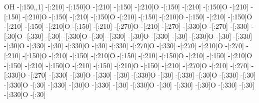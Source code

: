               OH%
    -[:150,,1]%
       -[:210]%
       -[:150]O%
       -[:210]%
       -[:150]%
       -[:210]O%
       -[:150]%
       -[:210]%
       -[:150]O%
       -[:210]%
       -[:150]%
       -[:210]O%
       -[:150]%
       -[:210]%
       -[:150]O%
       -[:210]%
       -[:150]%
       -[:210]O%
       -[:150]%
       -[:210]%
       -[:150]O%
       -[:210]%
       -[:150]%
       -[:210]O%
       -[:150]%
       -[:210]%
       -[:270]O%
       -[:210]%
       -[:270]%
       -[:330]O%
       -[:270]%
       -[:330]%
        -[:30]O%
       -[:330]%
        -[:30]%
       -[:330]O%
        -[:30]%
       -[:330]%
        -[:30]O%
       -[:330]%
        -[:30]%
       -[:330]O%
        -[:30]%
       -[:330]%
        -[:30]O%
       -[:330]%
        -[:30]%
       -[:330]O%
        -[:30]%
       -[:330]%
       -[:270]O%
       -[:330]%
       -[:270]%
       -[:210]O%
       -[:270]%
       -[:210]%
       -[:150]O%
       -[:210]%
       -[:150]%
       -[:210]O%
       -[:150]%
       -[:210]%
       -[:150]O%
       -[:210]%
       -[:150]%
       -[:210]O%
       -[:150]%
       -[:210]%
       -[:150]O%
       -[:210]%
       -[:150]%
       -[:210]O%
       -[:150]%
       -[:210]%
       -[:270]O%
       -[:210]%
       -[:270]%
       -[:330]O%
       -[:270]%
       -[:330]%
        -[:30]O%
       -[:330]%
        -[:30]%
       -[:330]O%
        -[:30]%
       -[:330]%
        -[:30]O%
       -[:330]%
        -[:30]%
       -[:330]O%
        -[:30]%
       -[:330]%
        -[:30]O%
       -[:330]%
        -[:30]%
       -[:330]O%
        -[:30]%
       -[:330]%
        -[:30]O%
       -[:330]%
        -[:30]%
       -[:330]O%
        -[:30]%